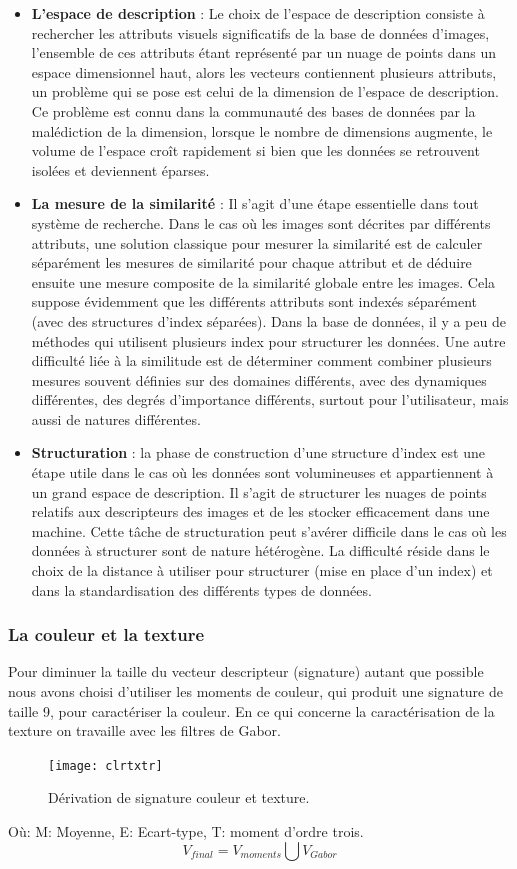 \begin{itemize}
	\item  \textbf{L'espace de description} : Le choix de l'espace de description consiste à rechercher les attributs visuels significatifs de la base de données d'images, l'ensemble de ces
	attributs étant représenté par un nuage de points dans un espace dimensionnel haut, alors les vecteurs contiennent plusieurs attributs, un problème qui se pose est celui de la dimension de l'espace de description. Ce problème est connu dans la communauté
	des bases de données par la malédiction de la dimension, lorsque le nombre de dimensions augmente, le volume de l'espace croît rapidement si bien que les données se retrouvent isolées et deviennent éparses.
	
	\item \textbf{ La mesure de la similarité} : Il s'agit d'une étape essentielle dans tout système de
	recherche. Dans le cas où les images sont décrites par différents attributs, une solution
	classique pour mesurer la similarité est de calculer séparément les mesures de
	similarité pour chaque attribut et de déduire ensuite une mesure composite de la
	similarité globale entre les images. Cela suppose évidemment que les différents
	attributs sont indexés séparément (avec des structures d'index séparées). Dans la base
	de données, il y a peu de méthodes qui utilisent plusieurs index pour structurer les
	données. Une autre difficulté liée à la similitude est de déterminer comment combiner
	plusieurs mesures souvent définies sur des domaines différents, avec des dynamiques
	différentes, des degrés d'importance différents, surtout pour l'utilisateur, mais aussi de
	natures différentes.
	
	\item \textbf{Structuration} : la phase de construction d'une structure d'index est une étape utile dans
	le cas où les données sont volumineuses et appartiennent à un grand espace de
	description. Il s'agit de structurer les nuages de points relatifs aux descripteurs des
	images et de les stocker efficacement dans une machine. Cette tâche de structuration
	peut s'avérer difficile dans le cas où les données à structurer sont de nature hétérogène.
	La difficulté réside dans le choix de la distance à utiliser pour structurer (mise en place
	d'un index) et dans la standardisation des différents types de données.
\end{itemize}
\subsubsection{La couleur et la texture}
Pour diminuer la taille du vecteur descripteur (signature) autant que possible nous avons choisi d'utiliser les moments de couleur, qui produit une signature de taille 9, pour caractériser la couleur. En ce qui concerne la caractérisation de la texture on travaille avec les filtres de Gabor.
\begin{figure}[H]
	\centering
	\texttt{[image: clrtxtr]}
	\caption{Dérivation de signature couleur et texture.}
\end{figure}
Où: 
M: Moyenne, E: Ecart-type, T: moment d'ordre trois.
\begin{equation}
V_{final} = V_{moments} \bigcup V_{Gabor}
\end{equation}
